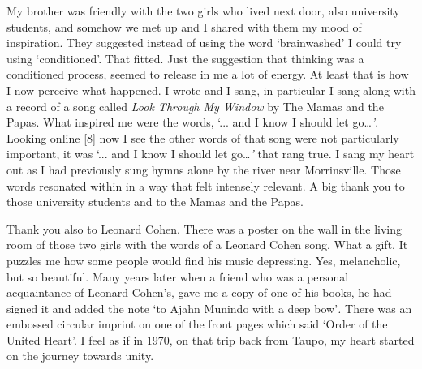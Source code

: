 My brother was friendly with the two girls who lived next door, also
university students, and somehow we met up and I shared with them my
mood of inspiration. They suggested instead of using the word
`brainwashed' I could try using `conditioned'. That fitted. Just the
suggestion that thinking was a conditioned process, seemed to release in
me a lot of energy. At least that is how I now perceive what happened. I
wrote and I sang, in particular I sang along with a record of a song
called \emph{Look Through My Window} by The Mamas and the Papas. What
inspired me were the words, `... and I know I should let
go\ldots{}\emph{'}.
\href{https://www.azlyrics.com/lyrics/mamasandthepapas/lookthroughmywindow.html}{\underline{Looking
online} {[}8{]}} now I see the other words of that song were not
particularly important, it was `... and I know I should let
go\ldots{}\emph{'} that rang true. I sang my heart out as I had
previously sung hymns alone by the river near Morrinsville. Those words
resonated within in a way that felt intensely relevant. A big thank you
to those university students and to the Mamas and the Papas.

Thank you also to Leonard Cohen. There was a poster on the wall in the
living room of those two girls with the words of a Leonard Cohen song.
What a gift. It puzzles me how some people would find his music
depressing. Yes, melancholic, but so beautiful. Many years later when a
friend who was a personal acquaintance of Leonard Cohen's, gave me a
copy of one of his books, he had signed it and added the note `to Ajahn
Munindo with a deep bow'\emph{.} There was an embossed circular imprint
on one of the front pages which said `Order of the United Heart'. I feel
as if in 1970, on that trip back from Taupo, my heart started on the
journey towards unity.

